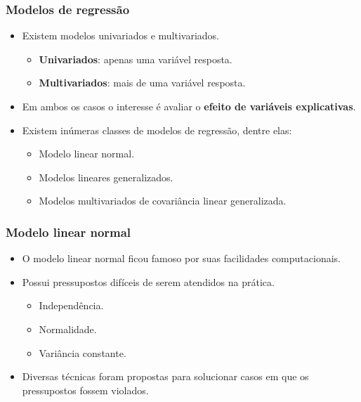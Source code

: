 \documentclass[10pt,
  aspectratio=169,
  serif,
  mathserif,
  professionalfont,
  compress,
  handout,
  ]{beamer}\usepackage[]{graphicx}\usepackage[]{color}
\begin{document}
\begin{frame}
  \frametitle{Modelos de regressão}

  \begin{itemize}
    \itemsep 2ex

  \item Existem modelos univariados e multivariados. 
  
    \begin{itemize}
      \item \textbf{Univariados}: apenas uma variável resposta.
      \item \textbf{Multivariados}: mais de uma variável resposta.
    \end{itemize}

  \item Em ambos os casos o interesse é avaliar o \textbf{efeito de variáveis explicativas}.
  
  \item Existem inúmeras classes de modelos de regressão, dentre elas: 
  \begin{itemize}
  \item Modelo linear normal.
  \item Modelos lineares generalizados.
  \item Modelos multivariados de covariância linear generalizada. 
\end{itemize}

  \end{itemize}
\end{frame}


\begin{frame}
  \frametitle{Modelo linear normal}

  \begin{itemize}
    \itemsep 2ex

  \item O modelo linear normal \cite{galton} ficou famoso por suas facilidades computacionais. 
  
  \item Possui pressupostos difíceis de serem atendidos na prática.
    \begin{itemize}
      \item Independência.
      \item Normalidade.
      \item Variância constante.
    \end{itemize}
  
  \item Diversas técnicas foram propostas para solucionar casos em que os pressupostos fossem violados.
  
  \end{itemize}
\end{frame}
\end{document}

